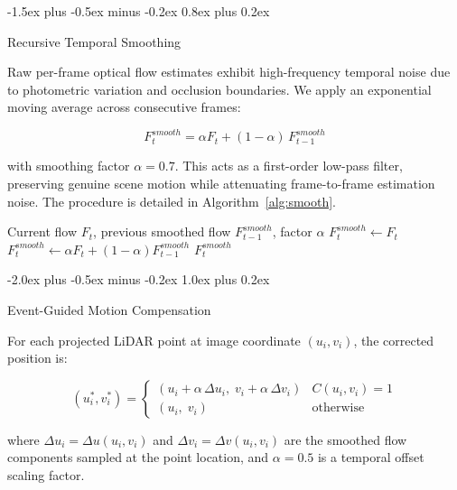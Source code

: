 \documentclass[conference]{IEEEtran}
\makeatletter
\def\section{\@startsection{section}{1}{\z@}
  {-2.0ex plus -0.5ex minus -0.2ex}
  {1.0ex plus 0.2ex}
  {\normalfont\large\bfseries\raggedright}}
\def\subsection{\@startsection{subsection}{2}{\z@}
  {-1.5ex plus -0.5ex minus -0.2ex}
  {0.8ex plus 0.2ex}
  {\normalfont\normalsize\bfseries\raggedright}}
\makeatother
\begin{document}
\subsection{Recursive Temporal Smoothing}

Raw per-frame optical flow estimates exhibit high-frequency temporal
noise due to photometric variation and occlusion boundaries. We apply
an exponential moving average across consecutive frames:

\begin{equation}
  F_t^{smooth} = \alpha F_t + (1-\alpha)\, F_{t-1}^{smooth}
  \label{eq:smoothing}
\end{equation}

with smoothing factor $\alpha = 0.7$. This acts as a first-order
low-pass filter, preserving genuine scene motion while attenuating
frame-to-frame estimation noise. The procedure is detailed in
Algorithm~\ref{alg:smooth}.

\begin{algorithm}[h]
\caption{Recursive Temporal Flow Smoothing}
\label{alg:smooth}
\begin{algorithmic}[1]
\REQUIRE Current flow $F_t$, previous smoothed flow
         $F_{t-1}^{smooth}$, factor $\alpha$
  \STATE $F_t^{smooth} \leftarrow F_t$
\ELSE
  \STATE $F_t^{smooth} \leftarrow
         \alpha F_t + (1-\alpha) F_{t-1}^{smooth}$
\ENDIF
\RETURN $F_t^{smooth}$
\end{algorithmic}
\end{algorithm}

\section{Event-Guided Motion Compensation}

For each projected LiDAR point at image coordinate $(u_i, v_i)$,
the corrected position is:

\begin{equation}
  (u_i^*, v_i^*) =
  \begin{cases}
    (u_i + \alpha\,\Delta u_i,\;
     v_i + \alpha\,\Delta v_i) & C(u_i,v_i) = 1 \\[4pt]
    (u_i,\; v_i) & \text{otherwise}
  \end{cases}
  \label{eq:correction}
\end{equation}

where $\Delta u_i = \Delta u(u_i,v_i)$ and
$\Delta v_i = \Delta v(u_i,v_i)$ are the smoothed flow components
sampled at the point location, and $\alpha = 0.5$ is a temporal
offset scaling factor.
\end{document}

